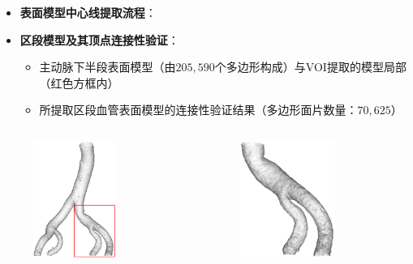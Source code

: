 \begin{frame}
\begin{itemize}
  \item \textbf{表面模型中心线提取流程}：
\end{itemize}
\begin{figure}[t]
\centering

\end{figure}
\end{frame}

\begin{frame}
\begin{itemize}
  \item \textbf{区段模型及其顶点连接性验证}：
  \begin{itemize}
     \item 主动脉下半段表面模型（由$205,590$个多边形构成）与VOI提取的模型局部（红色方框内）
     \item 所提取区段血管表面模型的连接性验证结果（多边形面片数量：$70,625$）
  \end{itemize}
\end{itemize}
\begin{columns}[b,onlytextwidth]
\begin{column}{.5\textwidth}
 \begin{figure}[t]
\centering
\includegraphics[height=1.5in]{../../Figures/postprocessing/centerlines/VOI.eps}
\end{figure}
\end{column}
\begin{column}{.5\textwidth}
 \begin{figure}[t]
\centering
\includegraphics[height=1.5in]{../../Figures/postprocessing/centerlines/connectivity_local.eps}
\end{figure}
\end{column}
\end{columns}
\end{frame}

